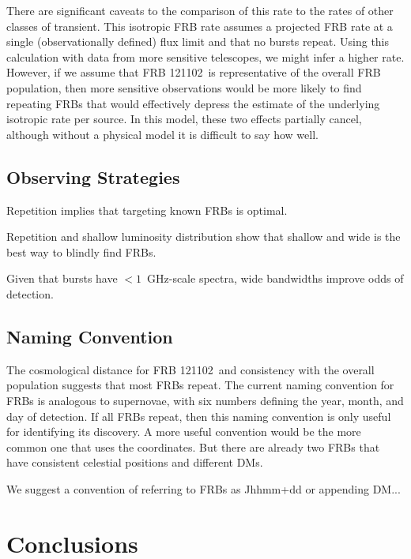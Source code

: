 \documentclass[twocolumn]{aastex61}
\newcommand{\frb}{FRB 121102}
\begin{document}
There are significant caveats to the comparison of this rate to the rates of other classes of transient. This isotropic FRB rate assumes a projected FRB rate at a single (observationally defined) flux limit and that no bursts repeat. Using this calculation with data from more sensitive telescopes, we might infer a higher rate. However, if we assume that \frb\ is representative of the overall FRB population, then more sensitive observations would be more likely to find repeating FRBs that would effectively depress the estimate of the underlying isotropic rate per source. In this model, these two effects partially cancel, although without a physical model it is difficult to say how well.

\subsection{Observing Strategies}

Repetition implies that targeting known FRBs is optimal.

Repetition and shallow luminosity distribution show that shallow and wide is the best way to blindly find FRBs.

Given that bursts have $<1$~GHz-scale spectra, wide bandwidths improve odds of detection.


\subsection{Naming Convention}

The cosmological distance for \frb\ and consistency with the overall population suggests that most FRBs repeat. The current naming convention for FRBs is analogous to supernovae, with six numbers defining the year, month, and day of detection. If all FRBs repeat, then this naming convention is only useful for identifying its discovery. A more useful convention would be the more common one that uses the coordinates. But there are already two FRBs that have consistent celestial positions and different DMs.

We suggest a convention of referring to FRBs as Jhhmm+dd or appending DM...


\section{Conclusions}


\end{document}
